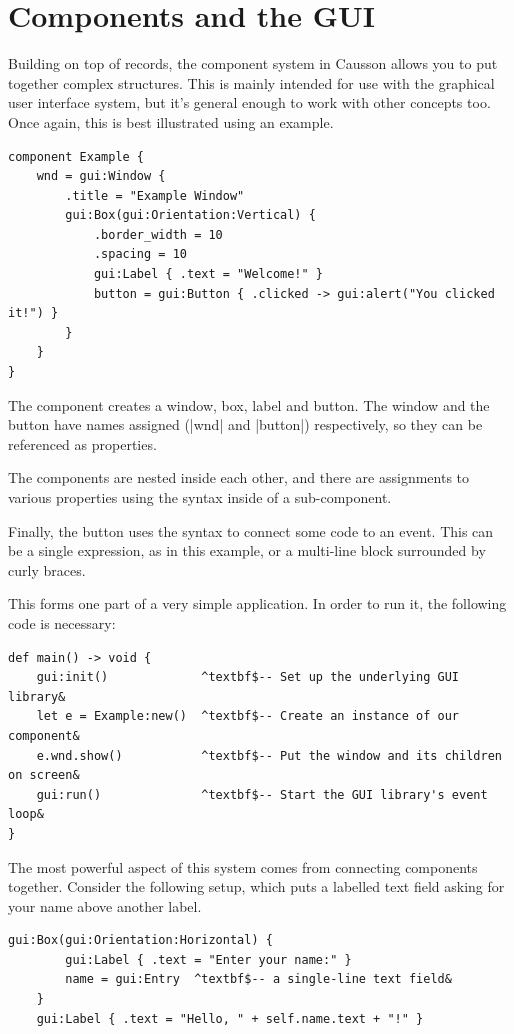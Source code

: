 \documentclass[11pt]{report}
\begin{document}
\section{Components and the GUI}

Building on top of records, the component system in Causson allows you to put together complex structures. This is mainly intended for use with the graphical user interface system, but it's general enough to work with other concepts too. Once again, this is best illustrated using an example.

\begin{Verbatim}
component Example {
    wnd = gui:Window {
        .title = "Example Window"
        gui:Box(gui:Orientation:Vertical) {
            .border_width = 10
            .spacing = 10
            gui:Label { .text = "Welcome!" }
            button = gui:Button { .clicked -> gui:alert("You clicked it!") }
        }
    }
}
\end{Verbatim}

The component creates a window, box, label and button. The window and the button have names assigned (|wnd| and |button|) respectively, so they can be referenced as properties.

The components are nested inside each other, and there are assignments to various properties using the syntax  inside of a sub-component.

Finally, the button uses the syntax  to connect some code to an event. This can be a single expression, as in this example, or a multi-line block surrounded by curly braces.

This forms one part of a very simple application. In order to run it, the following code is necessary:

\begin{Verbatim}[commandchars=^$&]
def main() -> void {
    gui:init()             ^textbf$-- Set up the underlying GUI library&
    let e = Example:new()  ^textbf$-- Create an instance of our component&
    e.wnd.show()           ^textbf$-- Put the window and its children on screen&
    gui:run()              ^textbf$-- Start the GUI library's event loop&
}
\end{Verbatim}

The most powerful aspect of this system comes from connecting components together. Consider the following setup, which puts a labelled text field asking for your name above another label.

\begin{Verbatim}[commandchars=^$&]
    gui:Box(gui:Orientation:Horizontal) {
        gui:Label { .text = "Enter your name:" }
        name = gui:Entry  ^textbf$-- a single-line text field&
    }
    gui:Label { .text = "Hello, " + self.name.text + "!" }
\end{Verbatim}
\end{document}
